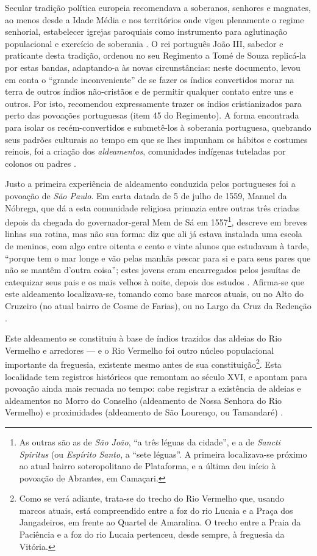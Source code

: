 Secular tradição política europeia recomendava a soberanos, senhores e magnates, ao menos desde a Idade Média e nos territórios onde vigeu plenamente o regime senhorial, estabelecer igrejas paroquiais como instrumento para aglutinação populacional e exercício de soberania \cite[pp.~193-205]{BERNARDO1997}. O rei português João III, sabedor e praticante desta tradição, ordenou no seu Regimento a Tomé de Souza replicá-la por estas bandas, adaptando-a às novas circunstâncias: neste documento, levou em conta o ``grande inconveniente'' de se fazer os índios convertidos morar na terra de outros índios não-cristãos e de permitir qualquer contato entre uns e outros. Por isto, recomendou expressamente trazer os índios cristianizados para perto das povoações portuguesas (item 45 do Regimento). A forma encontrada para isolar os recém-convertidos e submetê-los à soberania portuguesa, quebrando seus padrões culturais ao tempo em que se lhes impunham os hábitos e costumes reinois, foi a criação dos \textit{aldeamentos}, comunidades indígenas tuteladas por colonos ou padres \cite[pp.~72-76]{santos_salvador_2004}.

Justo a primeira experiência de aldeamento conduzida pelos portugueses foi a povoação de \textit{São Paulo}. Em carta datada de 5 de julho de 1559, Manuel da Nóbrega, que dá a esta comunidade religiosa primazia entre outras três criadas depois da chegada do governador-geral Mem de Sá em 1557\footnote{As outras são as de \textit{São João}, ``a três léguas da cidade'', e a de \textit{Sancti Spiritus} (ou \textit{Espírito Santo}, a ``sete léguas''. A primeira localizava-se próximo ao atual bairro soteropolitano de Plataforma, e a última deu início à povoação de Abrantes, em Camaçari.}, descreve em breves linhas sua rotina, mas não sua forma: diz que ali já estava instalada uma escola de meninos, com algo entre oitenta e cento e vinte alunos que estudavam à tarde, ``porque tem o mar longe e vão pelas manhãs pescar para si e para seus pares que não se mantêm d'outra coisa''; estes jovens eram encarregados pelos jesuítas de catequizar seus pais e os mais velhos à noite, depois dos estudos \cite[p.~179]{nobrega_cartas_1931}. Afirma-se que este aldeamento localizava-se, tomando como base marcos atuais, ou no Alto do Cruzeiro (no atual bairro de Cosme de Farias), ou no Largo da Cruz da Redenção \cite[p.~87]{campos_brotas_1942}.

Este aldeamento se constituiu à base de índios trazidos das aldeias do Rio Vermelho e arredores --- e o Rio Vermelho foi outro núcleo populacional importante da freguesia, existente mesmo antes de sua constituição\footnote{Como se verá adiante, trata-se do trecho do Rio Vermelho que, usando marcos atuais, está compreendido entre a foz do rio Lucaia e a Praça dos Jangadeiros, em frente ao Quartel de Amaralina. O trecho entre a Praia da Paciência e a foz do rio Lucaia pertenceu, desde sempre, à freguesia da Vitória.}. Esta localidade tem registros históricos que remontam ao século XVI, e apontam para povoação ainda mais recuada no tempo: cabe registrar a existência de aldeias e aldeamentos no Morro do Conselho (aldeamento de Nossa Senhora do Rio Vermelho) e proximidades (aldeamento de São Lourenço, ou Tamandaré) \cite[p.~75]{santos_salvador_2004}.

